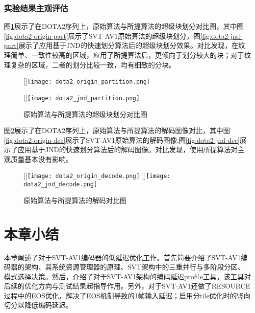 \begin{table}[!hpt]
\begin{tabular}{|c|c|c|c|c|c|c|c|}
       \\\hline
    \end{tabular}
  \end{table}

  \subsubsection{实验结果主观评估}

  图\ref{fig:dota2-part}展示了在DOTA2序列上，原始算法与所提算法的超级块划分对比图，其中图\ref{fig:dota2-origin-part}展示了SVT-AV1原始算法的超级块划分，图\ref{fig:dota2-jnd-part}展示了应用基于JND的快速划分算法后的超级块划分效果。对比发现，在纹理简单、一致性较高的区域，应用了所提算法后，更倾向于划分较大的块；对于纹理复杂的区域，二者的划分比较一致，均有细致的分块。

  \begin{figure}[!hbtp]
    \centering
                    [\textwidth]{\texttt{[image: dota2\_origin\_partition.png]}}
    \vspace{0.5cm}

                    [\textwidth]{\texttt{[image: dota2\_jnd\_partition.png]}}
    \caption{原始算法与所提算法的超级块划分对比图}
    \label{fig:dota2-part}
  \end{figure}

  图\ref{fig:dota2-decode}展示了在DOTA2序列上，原始算法与所提算法的解码图像对比，其中图\ref{fig:dota2-origin-dec}展示了SVT-AV1原始算法的解码图像,图\ref{fig:dota2-jnd-dec}展示了应用基于JND的快速划分算法后的解码图像。对比发现，使用所提算法对主观质量基本没有影响。

  \begin{figure}[!hbtp]
    \centering
                    [\textwidth]{\texttt{[image: dota2\_origin\_decode.png]}}
    \vspace{0.5cm}
                    [\textwidth]{\texttt{[image: dota2\_jnd\_decode.png]}}
    \caption{原始算法与所提算法的解码对比图}
    \label{fig:dota2-decode}
  \end{figure}

  \section{本章小结}
  本章阐述了对于SVT-AV1编码器的低延迟优化工作。首先简要介绍了SVT-AV1编码器的架构、其系统资源管理器的原理、SVT架构中的三重并行与多阶段分区、模式选择决策。然后，介绍了对于SVT-AV1架构的编码延迟profile工具，该工具对后续的优化方向与测试结果起指导作用。另外，对于SVT-AV1还做了RESOURCE过程中的EOS优化，解决了EOS机制导致的1帧输入延迟；启用分tile优化时的竖向切分以降低编码延迟。

